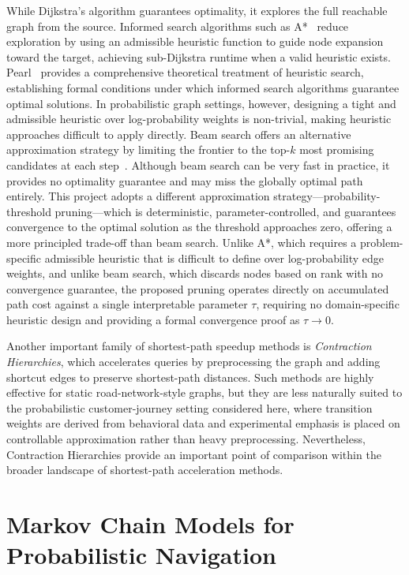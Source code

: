 While Dijkstra's algorithm guarantees optimality, it explores the full reachable graph from the source. Informed search algorithms such as A*~\citep{hart1968astar} reduce exploration by using an admissible heuristic function to guide node expansion toward the target, achieving sub-Dijkstra runtime when a valid heuristic exists. Pearl~\citep{pearl1984heuristics} provides a comprehensive theoretical treatment of heuristic search, establishing formal conditions under which informed search algorithms guarantee optimal solutions. In probabilistic graph settings, however, designing a tight and admissible heuristic over log-probability weights is non-trivial, making heuristic approaches difficult to apply directly. Beam search offers an alternative approximation strategy by limiting the frontier to the top-$k$ most promising candidates at each step~\citep{cormen2009}. Although beam search can be very fast in practice, it provides no optimality guarantee and may miss the globally optimal path entirely. This project adopts a different approximation strategy---probability-threshold pruning---which is deterministic, parameter-controlled, and guarantees convergence to the optimal solution as the threshold approaches zero, offering a more principled trade-off than beam search. Unlike A*, which requires a problem-specific admissible heuristic that is difficult to define over log-probability edge weights, and unlike beam search, which discards nodes based on rank with no convergence guarantee, the proposed pruning operates directly on accumulated path cost against a single interpretable parameter $\tau$, requiring no domain-specific heuristic design and providing a formal convergence proof as $\tau \to 0$.

Another important family of shortest-path speedup methods is \emph{Contraction Hierarchies}, which accelerates queries by preprocessing the graph and adding shortcut edges to preserve shortest-path distances. Such methods are highly effective for static road-network-style graphs, but they are less naturally suited to the probabilistic customer-journey setting considered here, where transition weights are derived from behavioral data and experimental emphasis is placed on controllable approximation rather than heavy preprocessing. Nevertheless, Contraction Hierarchies provide an important point of comparison within the broader landscape of shortest-path acceleration methods.

\section{Markov Chain Models for Probabilistic Navigation}

